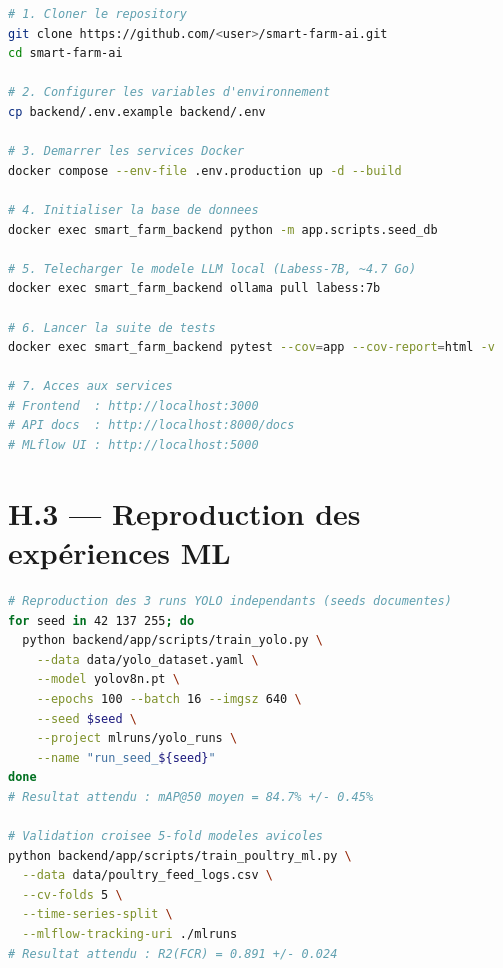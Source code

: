 \documentclass[12pt,a4paper,twoside]{report}
\newcounter{hi}
\begin{document}
\begin{lstlisting}[language=bash,
  caption={Script de démarrage complet},
  label={lst:setup}]
# 1. Cloner le repository
git clone https://github.com/<user>/smart-farm-ai.git
cd smart-farm-ai

# 2. Configurer les variables d'environnement
cp backend/.env.example backend/.env

# 3. Demarrer les services Docker
docker compose --env-file .env.production up -d --build

# 4. Initialiser la base de donnees
docker exec smart_farm_backend python -m app.scripts.seed_db

# 5. Telecharger le modele LLM local (Labess-7B, ~4.7 Go)
docker exec smart_farm_backend ollama pull labess:7b

# 6. Lancer la suite de tests
docker exec smart_farm_backend pytest --cov=app --cov-report=html -v

# 7. Acces aux services
# Frontend  : http://localhost:3000
# API docs  : http://localhost:8000/docs
# MLflow UI : http://localhost:5000
\end{lstlisting}

\section*{H.3 — Reproduction des expériences ML}

\begin{lstlisting}[language=bash,
  caption={Reproduction des entraînements YOLO et ML avicoles},
  label={lst:ml_repro}]
# Reproduction des 3 runs YOLO independants (seeds documentes)
for seed in 42 137 255; do
  python backend/app/scripts/train_yolo.py \
    --data data/yolo_dataset.yaml \
    --model yolov8n.pt \
    --epochs 100 --batch 16 --imgsz 640 \
    --seed $seed \
    --project mlruns/yolo_runs \
    --name "run_seed_${seed}"
done
# Resultat attendu : mAP@50 moyen = 84.7% +/- 0.45%

# Validation croisee 5-fold modeles avicoles
python backend/app/scripts/train_poultry_ml.py \
  --data data/poultry_feed_logs.csv \
  --cv-folds 5 \
  --time-series-split \
  --mlflow-tracking-uri ./mlruns
# Resultat attendu : R2(FCR) = 0.891 +/- 0.024
\end{lstlisting}

\printbibliography[heading=bibintoc, title={Références Bibliographiques}]
\end{document}
